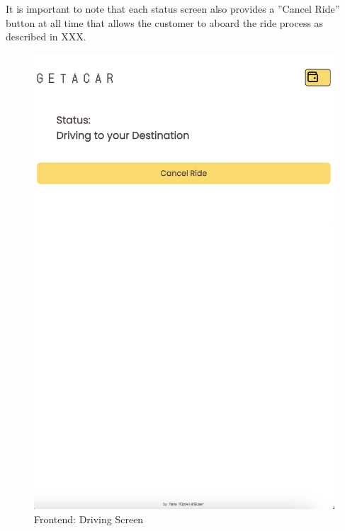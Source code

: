 It is important to note that each status screen also provides a ''Cancel Ride'' button at all time that allows the customer to aboard the ride process as described in XXX.

\begin{figure}[H]
    \centering
    
    \begin{minipage}{0.45\linewidth}
        \centering
        \includegraphics[width=\linewidth]{data/ffss/9.png}
        \caption{Frontend: Driving Screen}
        \label{fig:DrivingScreen}
    \end{minipage}
    \hfill
    \begin{minipage}{0.45\linewidth}
        \centering

\end{minipage}
\end{figure}
